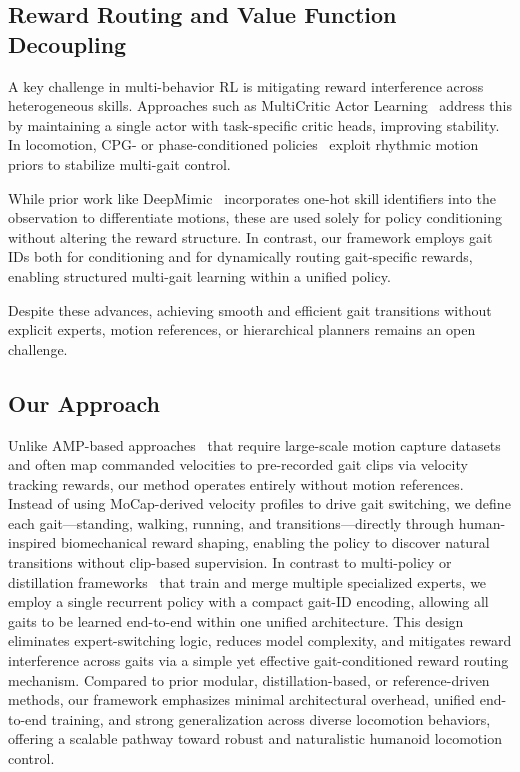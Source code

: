 \documentclass[letterpaper, 10 pt, conference]{ieeeconf}
\begin{document}
\subsection{Reward Routing and Value Function Decoupling}

A key challenge in multi-behavior RL is mitigating reward interference across heterogeneous skills. Approaches such as MultiCritic Actor Learning~\cite{mysore2022multi} address this by maintaining a single actor with task-specific critic heads, improving stability. In locomotion, CPG- or phase-conditioned policies~\cite{hwangbo2019learning, rudin2022learning} exploit rhythmic motion priors to stabilize multi-gait control.

While prior work like DeepMimic~\cite{peng2018deepmimic} incorporates one-hot skill identifiers into the observation to differentiate motions, these are used solely for policy conditioning without altering the reward structure. In contrast, our framework employs gait IDs both for conditioning and for dynamically routing gait-specific rewards, enabling structured multi-gait learning within a unified policy.

Despite these advances, achieving smooth and efficient gait transitions without explicit experts, motion references, or hierarchical planners remains an open challenge.



\subsection{Our Approach}

Unlike AMP-based approaches~\cite{peng2018deepmimic, peng2021amp} that require large-scale motion capture datasets and often map commanded velocities to pre-recorded gait clips via velocity tracking rewards, our method operates entirely without motion references. Instead of using MoCap-derived velocity profiles to drive gait switching, we define each gait—standing, walking, running, and transitions—directly through human-inspired biomechanical reward shaping, enabling the policy to discover natural transitions without clip-based supervision.
In contrast to multi-policy or distillation frameworks~\cite{rusu2015policy, ross2011reduction} that train and merge multiple specialized experts, we employ a single recurrent policy with a compact gait-ID encoding, allowing all gaits to be learned end-to-end within one unified architecture. This design eliminates expert-switching logic, reduces model complexity, and mitigates reward interference across gaits via a simple yet effective gait-conditioned reward routing mechanism. Compared to prior modular, distillation-based, or reference-driven methods, our framework emphasizes minimal architectural overhead, unified end-to-end training, and strong generalization across diverse locomotion behaviors, offering a scalable pathway toward robust and naturalistic humanoid locomotion control.
\end{document}
